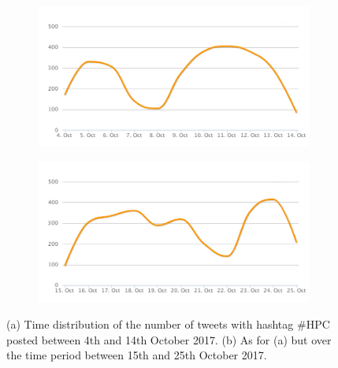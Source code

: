 \begin{figure}
 \centering
 \begin{subfigure}[b]{0.9\textwidth}
   \includegraphics[width=1\linewidth]{Images/FirstSearch_HPC.png}
   \caption{} 
 \end{subfigure}

 \begin{subfigure}[b]{0.9\textwidth}
   \includegraphics[width=1\linewidth]{Images/SecondSearch_HPC.png}
   \caption{}
 \end{subfigure}
 \caption{(a) Time distribution of the number of tweets with hashtag \#HPC posted between 4th and 14th October 2017. (b) As for (a) but over the time period between 15th and 25th October 2017.} 
 \label{First-SecondSearch_HPC}
\end{figure}

